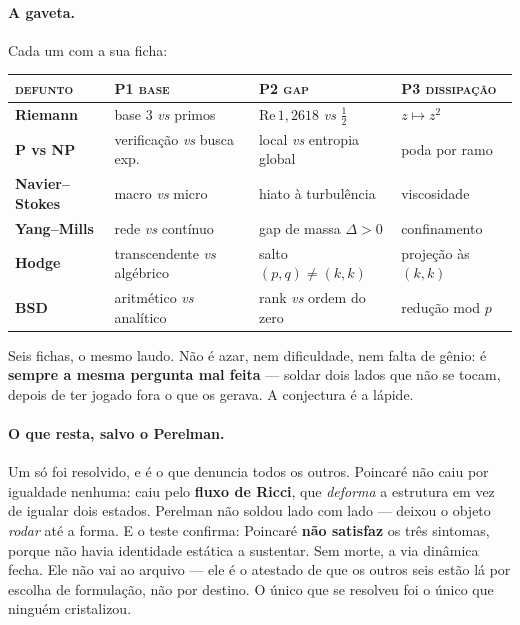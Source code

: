 \documentclass[11pt]{article}
\theoremstyle{plain}
\theoremstyle{remark}
\begin{document}
\paragraph{A gaveta.} Cada um com a sua ficha:
\begin{center}\small
\renewcommand{\arraystretch}{1.3}
\begin{tabular}{@{}llll@{}}
\toprule
\textsc{defunto} & \textsc{P1 base} & \textsc{P2 gap} & \textsc{P3 dissipação} \\
\midrule
\textbf{Riemann} & base $3$ \emph{vs} primos & $\mathrm{Re}\,1{,}2618$ \emph{vs} $\tfrac12$ & $z\mapsto z^2$ \\
\textbf{P vs NP} & verificação \emph{vs} busca exp. & local \emph{vs} entropia global & poda por ramo \\
\textbf{Navier--Stokes} & macro \emph{vs} micro & hiato à turbulência & viscosidade \\
\textbf{Yang--Mills} & rede \emph{vs} contínuo & gap de massa $\Delta>0$ & confinamento \\
\textbf{Hodge} & transcendente \emph{vs} algébrico & salto $(p,q)\neq(k,k)$ & projeção às $(k,k)$ \\
\textbf{BSD} & aritmético \emph{vs} analítico & rank \emph{vs} ordem do zero & redução mod $p$ \\
\bottomrule
\end{tabular}
\end{center}
Seis fichas, o mesmo laudo. Não é azar, nem dificuldade, nem falta de gênio: é
\textbf{sempre a mesma pergunta mal feita} --- soldar dois lados que não se tocam,
depois de ter jogado fora o que os gerava. A conjectura é a lápide.

\paragraph{O que resta, salvo o Perelman.} Um só foi resolvido, e é o que denuncia
todos os outros. Poincaré não caiu por igualdade nenhuma: caiu pelo \textbf{fluxo de
Ricci}, que \emph{deforma} a estrutura em vez de igualar dois estados. Perelman não
soldou lado com lado --- deixou o objeto \emph{rodar} até a forma. E o teste
confirma: Poincaré \textbf{não satisfaz} os três sintomas, porque não havia identidade
estática a sustentar. Sem morte, a via dinâmica fecha. Ele não vai ao arquivo ---
ele é o atestado de que os outros seis estão lá por escolha de formulação, não por
destino. O único que se resolveu foi o único que ninguém cristalizou.
\end{document}
